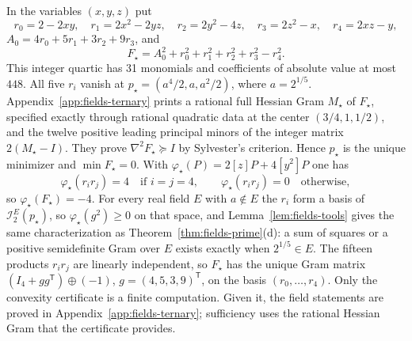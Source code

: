 \begin{example}
\label{ex:fields-ternary}
In the variables $(x,y,z)$ put
\[
 r_0=2-2xy,\quad r_1=2x^2-2yz,\quad r_2=2y^2-4z,\quad r_3=2z^2-x,\quad
 r_4=2xz-y,
\]
$A_0=4r_0+5r_1+3r_2+9r_3$, and
\begin{equation}
 F_\star=A_0^2+r_0^2+r_1^2+r_2^2+r_3^2-r_4^2 .
 \label{eq:fields-ternary}
\end{equation}
This integer quartic has 31 monomials and coefficients of absolute value at
most $448$. All five $r_i$ vanish at $p_\star=(a^4/2,a,a^2/2)$, where
$a=2^{1/5}$. Appendix~\ref{app:fields-ternary} prints a rational full
Hessian Gram $M_\star$ of $F_\star$, specified exactly through rational
quadratic data at the center $(3/4,1,1/2)$, and the twelve positive leading
principal minors of the integer matrix $2(M_\star-I)$. They prove
$\nabla^2F_\star\succeq I$ by Sylvester's criterion. Hence $p_\star$ is the
unique minimizer and $\min F_\star=0$. With
$\varphi_\star(P)=2[z]P+4[y^2]P$ one has
\[
 \varphi_\star(r_ir_j)=4\quad\text{if }i=j=4,\qquad
 \varphi_\star(r_ir_j)=0\quad\text{otherwise},
\]
so $\varphi_\star(F_\star)=-4$. For every real field $E$ with $a\notin E$
the $r_i$ form a basis of $\mathcal I_2^E(p_\star)$, so
$\varphi_\star(g^2)\ge0$ on that space, and Lemma~\ref{lem:fields-tools}
gives the same characterization as Theorem~\ref{thm:fields-prime}(d): a sum
of squares or a positive semidefinite Gram over $E$ exists exactly when
$2^{1/5}\in E$. The fifteen products $r_ir_j$ are linearly independent, so
$F_\star$ has the unique Gram matrix $(I_4+gg^{\mathsf T})\oplus(-1)$,
$g=(4,5,3,9)^{\mathsf T}$, on the basis $(r_0,\ldots,r_4)$. Only the
convexity certificate is a finite computation. Given it, the field statements
are proved in Appendix~\ref{app:fields-ternary}; sufficiency uses the rational
Hessian Gram that the certificate provides.
\end{example}

